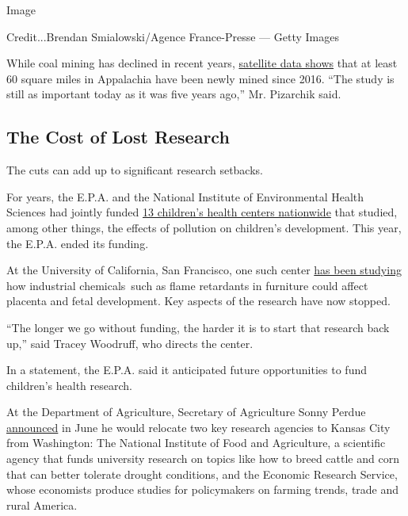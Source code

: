 Image

Credit...Brendan Smialowski/Agence France-Presse --- Getty Images

While coal mining has declined in recent years,
\href{https://skytruth.org/2019/11/new-data-available-on-the-footprint-of-surface-mining-in-central-appalachia/}{satellite
data shows} that at least 60 square miles in Appalachia have been newly
mined since 2016. ``The study is still as important today as it was five
years ago,'' Mr. Pizarchik said.

\hypertarget{the-cost-of-lost-research}{%
\subsection{The Cost of Lost Research}\label{the-cost-of-lost-research}}

The cuts can add up to significant research setbacks.

For years, the E.P.A. and the National Institute of Environmental Health
Sciences had jointly funded
\href{https://www.niehs.nih.gov/research/supported/centers/prevention/grantees/index.cfm}{13
children's health centers nationwide} that studied, among other things,
the effects of pollution on children's development. This year, the
E.P.A. ended its funding.

At the University of California, San Francisco, one such center
\href{https://prhe.ucsf.edu/childrens-center}{has been studying} how
industrial chemicals~such as flame retardants in furniture could affect
placenta and fetal development. Key aspects of the research have now
stopped.

``The longer we go without funding, the harder it is to start that
research back up,'' said Tracey Woodruff, who directs the center.

In a statement, the E.P.A. said it anticipated future opportunities to
fund children's health research.

At the Department of Agriculture, Secretary of Agriculture Sonny Perdue
\href{https://www.usda.gov/media/press-releases/2019/06/13/secretary-perdue-announces-kansas-city-region-location-ers-and-nifa}{announced}
in June he would relocate two key research agencies to Kansas City from
Washington: The National Institute of Food and Agriculture, a scientific
agency that funds university research on topics like how to breed cattle
and corn that can better tolerate drought conditions, and the Economic
Research Service, whose economists produce studies for policymakers on
farming trends, trade and rural America.

